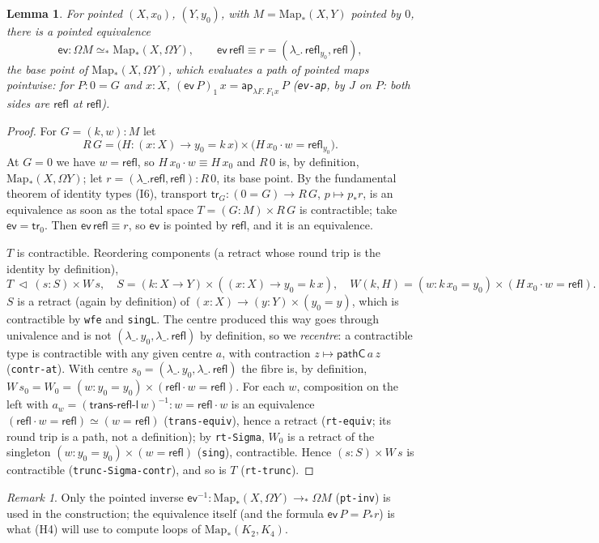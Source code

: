\documentclass[11pt]{amsart}
\newtheorem{lemma}[theorem]{Lemma}
\theoremstyle{definition}
\theoremstyle{remark}
\newtheorem{remark}[theorem]{Remark}
\newcommand{\Om}{\Omega}
\newcommand{\Map}{\mathrm{Map}_*}
\newcommand{\code}[1]{\texttt{#1}}
\newcommand{\cc}{\cdot}
\newcommand{\refl}{\mathsf{refl}}
\newcommand{\ev}{\mathsf{ev}}
\begin{document}
\begin{lemma}\label{lem:loops}
For pointed $(X,x_0)$, $(Y,y_0)$, with $M=\Map(X,Y)$ pointed by $0$,
there is a pointed equivalence
\[\ev:\Om M\simeq_*\Map(X,\Om Y),\qquad \ev\,\refl\equiv r
  =(\lambda\_.\,\refl_{y_0},\refl),\]
the base point of $\Map(X,\Om Y)$, which evaluates a path of pointed maps
pointwise: for $P:0=G$ and $x:X$, $(\ev\,P)_1\,x=\mathsf{ap}_{\lambda F.\,F_1x}\,P$
(\code{ev-ap}, by $J$ on $P$: both sides are $\refl$ at $\refl$).
\end{lemma}
\begin{proof}
For $G=(k,w):M$ let
\[R\,G=\bigl(H:(x:X)\to y_0=k\,x\bigr)\times\bigl(H\,x_0\cc w=\refl_{y_0}\bigr).\]
At $G=0$ we have $w=\refl$, so $H\,x_0\cc w\equiv H\,x_0$ and $R\,0$ is,
by definition, $\Map(X,\Om Y)$; let $r=(\lambda\_.\refl,\refl):R\,0$, its
base point. By the fundamental theorem of identity types (I6), transport
$\mathsf{tr}_G:(0=G)\to R\,G$, $p\mapsto p_*r$, is an equivalence as soon
as the total space $T=(G:M)\times R\,G$ is contractible; take
$\ev=\mathsf{tr}_0$. Then $\ev\,\refl\equiv r$, so $\ev$ is pointed by
$\refl$, and it is an equivalence.

$T$ is contractible. Reordering components (a retract whose round trip is
the identity by definition),
\[T\ \lhd\ (s:S)\times W\,s,\quad S=(k:X\to Y)\times((x:X)\to y_0=k\,x),\quad
W(k,H)=(w:k\,x_0=y_0)\times(H\,x_0\cc w=\refl).\]
$S$ is a retract (again by definition) of $(x:X)\to(y:Y)\times(y_0=y)$,
which is contractible by \code{wfe} and \code{singL}. The centre produced
this way goes through univalence and is not $(\lambda\_.\,y_0,\lambda\_.\,\refl)$
by definition, so we \emph{recentre}: a contractible type is contractible
with any given centre $a$, with contraction $z\mapsto\mathsf{pathC}\,a\,z$
(\code{contr-at}). With centre $s_0=(\lambda\_.\,y_0,\lambda\_.\,\refl)$ the
fibre is, by definition, $W\,s_0=W_0=(w:y_0=y_0)\times(\refl\cc w=\refl)$.
For each $w$, composition on the left with
$a_w=(\mathsf{trans\text{-}refl\text{-}l}\,w)^{-1}:w=\refl\cc w$ is an
equivalence $(\refl\cc w=\refl)\simeq(w=\refl)$ (\code{trans-equiv}), hence
a retract (\code{rt-equiv}; its round trip is a path, not a definition);
by \code{rt-Sigma}, $W_0$ is a retract of the singleton
$(w:y_0=y_0)\times(w=\refl)$ (\code{sing}), contractible. Hence
$(s:S)\times W\,s$ is contractible (\code{trunc-Sigma-contr}), and so is
$T$ (\code{rt-trunc}).
\end{proof}

\begin{remark}
Only the pointed inverse $\ev^{-1}:\Map(X,\Om Y)\to_*\Om M$
(\code{pt-inv}) is used in the construction; the equivalence itself
(and the formula $\ev\,P=P_*r$) is what (H4) will use to compute loops of
$\Map(K_2,K_4)$.
\end{remark}
\end{document}
